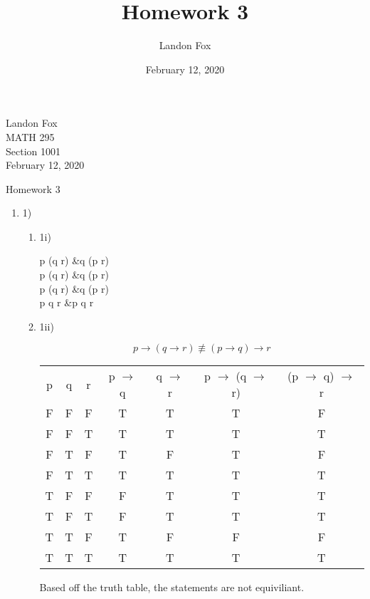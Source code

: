 \documentclass[ 12pt ]{article}
\begin{document}
\title{Homework 3}
\author{Landon Fox}
\date{February 12, 2020}

\begin{flushleft}
Landon Fox \\
MATH 295 \\
Section 1001 \\
February 12, 2020
\end{flushleft}
\begin{center}
Homework 3
\end{center}

\begin{enumerate}[\hspace{30pt}]
	\item 1)
	\begin{enumerate}[\hspace{30pt}]
		\item 1i)
		\begin{flalign}
			\lnot p \rightarrow (q \rightarrow r) &\equiv q \rightarrow (p \vee r) \nonumber \\
			p \vee (q \rightarrow r) &\equiv \lnot q \vee (p \vee r) \nonumber \\
			p \vee (\lnot q \vee r) &\equiv \lnot q \vee (p \vee r) \nonumber \\
			p \vee \lnot q \vee r &\equiv p \vee \lnot q \vee r \nonumber
		\end{flalign}

		\item 1ii)
		\begin{center}
			$$p \rightarrow (q \rightarrow r) \not\equiv (p \rightarrow q) \rightarrow r$$
			\begin{tabular}{ |c|c|c|c|c|c|c| } 
				 \hline
				 p & q & r & p $\rightarrow$ q & q $\rightarrow$ r & p $\rightarrow$ (q $\rightarrow$ r) & (p $\rightarrow$ q) $\rightarrow$ r \\ 
				 F & F & F & T & T & T & F \\
				 F & F & T & T & T & T & T \\
				 F & T & F & T & F & T & F \\
				 F & T & T & T & T & T & T \\
				 T & F & F & F & T & T & T \\
				 T & F & T & F & T & T & T \\
				 T & T & F & T & F & F & F \\
				 T & T & T & T & T & T & T \\
				 \hline
			\end{tabular}
		\newline
		\newline
		Based off the truth table, the statements are not equiviliant. 
		\end{center}
	\end{enumerate}


\end{enumerate}
\end{document}

